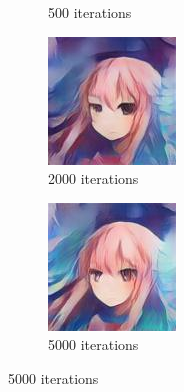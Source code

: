 \documentclass{article}
\begin{document}
\begin{figure}[h!]
\begin{subfigure}[b]{0.24\textwidth}
         \caption{500 iterations}
     \end{subfigure}
     \begin{subfigure}[b]{0.24\textwidth}
         \centering
         \includegraphics[width=\textwidth]{illustration/anime_sngan_2000.jpg}
         \caption{2000 iterations}
     \end{subfigure}
     \begin{subfigure}[b]{0.24\textwidth}
         \centering
         \includegraphics[width=\textwidth]{illustration/anime_sngan_5000.jpg}
         \caption{5000 iterations}
     \end{subfigure}
\end{figure}
\end{document}
